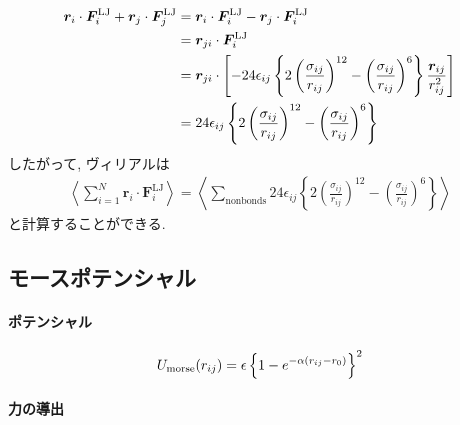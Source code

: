 \begin{align}
    \bm{r}_{i} \cdot \bm{F}_{i}^{\mathrm{LJ}}
   +\bm{r}_{j} \cdot \bm{F}_{j}^{\mathrm{LJ}}
 &=
    \bm{r}_{i} \cdot \bm{F}_{i}^{\mathrm{LJ}}
   -\bm{r}_{j} \cdot \bm{F}_{i}^{\mathrm{LJ}}
 \notag
 \\
 &=
    \bm{r}_{ji} \cdot \bm{F}_{i}^{\mathrm{LJ}}
 \notag
 \\
 &=
    \bm{r}_{ji} \cdot
    \left[
          -24\epsilon_{ij}
          \left\{
                  2\left( \frac{\sigma_{ij}}{r_{ij}} \right)^{12}
                  -\left( \frac{\sigma_{ij}}{r_{ij}} \right)^{6}
          \right\}
          \frac{\bm{r}_{ij}}{r_{ij}^{2}}
    \right]
 \notag
 \\
 &=
     24\epsilon_{ij}
     \left\{
            2\left( \frac{\sigma_{ij}}{r_{ij}} \right)^{12}
            -\left( \frac{\sigma_{ij}}{r_{ij}} \right)^{6}
     \right\}
 \notag
\end{align}
したがって, ヴィリアルは
\begin{align}
   \left\langle
        \sum_{i=1}^{N} \bm{r}_{i} \cdot \bm{F}_{i}^{\mathrm{LJ}}
   \right\rangle
 =
   \left\langle
        \sum_{\mathrm{nonbonds}}24\epsilon_{ij}
        \left\{
               2\left( \frac{\sigma_{ij}}{r_{ij}} \right)^{12}
               -\left( \frac{\sigma_{ij}}{r_{ij}} \right)^{6}
        \right\}
   \right\rangle
\end{align}
と計算することができる. 
\clearpage


\subsection{モースポテンシャル}
\paragraph{ポテンシャル}

\begin{equation}
   U_{\mathrm{morse}} (r_{ij})
   =
   \epsilon
   \left\{
      1 - e^{-\alpha(r_{ij} - r_{0})}
   \right\}^{2}
   \notag
\end{equation}

\paragraph{力の導出}


